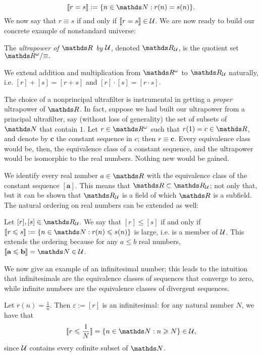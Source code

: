 \documentclass[draft.tex]{subfiles}
\begin{document}
\begin{equation*}
    \llbracket r = s \rrbracket := \{n \in \NN: r(n) = s(n)\}.
\end{equation*}
We now say that $r \equiv s$ if and only if $\llbracket r = s \rrbracket \in \mathcal{U}$. We are now ready to build our concrete example of nonstandard universe:
\begin{definition}
\label{def:ultrapower}
The \emph{ultrapower of $\RR$ by $\mathcal{U}$}, denoted $\RR_{\cl{U}}$, is the quotient set $\quot{\RR^{\omega}}{{\equiv}}.$ 
\end{definition}
We extend addition and multiplication from $\RR^{\omega}$ to $\RR_{\cl{U}}$ naturally, i.e. $[r]+[s] = [r+s]$ and $[r]\cdot[s] = [r \cdot s]$.
\begin{remark}
The choice of a nonprincipal ultrafilter is instrumental in getting a \emph{proper} ultrapower of $\RR$. In fact, suppose we had built our ultrapower from a principal ultrafilter, say (without loss of generality) the set of subsets of $\NN$ that contain $1$. Let $r \in \RR^{\omega}$ such that $r(1) = c \in \RR$, and denote by $\mathbf{c}$ the constant sequence in $c$; then $r \equiv \mathbf{c}$. Every equivalence class would be, then, the equivalence class of a constant sequence, and the ultrapower would be isomorphic to the real numbers. Nothing new would be gained.
\end{remark}
We identify every real number $a \in \RR$ with the equivalence class of the constant sequence $[\mathbf{a}]$. This means that $\RR \subset \RR_{\cl{U}}$; not only that, but it can be shown that $\RR_{\cl{U}}$ is a field of which $\RR$ is a subfield. The natural ordering on real numbers can be extended as well:
\begin{definition}
Let $[r], [s] \in \RR_{\cl{U}}$. We say that $[r] \leq [s]$ if and only if $\llbracket r \leq s \rrbracket := \{n \in \NN: r(n) \leq s(n)\}$ is large, i.e. is a member of $\mathcal{U}$. This extends the ordering because for any $a \leq b$ real numbers, $\llbracket \mathbf{a} \leq \mathbf{b} \rrbracket = \NN \in \cl{U}$.
\end{definition}
We now give an example of an infinitesimal number; this leads to the intuition that infinitesimals are the equivalence classes of sequences that converge to zero, while infinite numbers are the equivalence classes of divergent sequences.
\begin{example}
Let $r(n) = \frac{1}{n}$. Then $\varepsilon := [r]$ is an infinitesimal: for any natural number $N$, we have that
\begin{equation*}
    \llbracket r \leq \frac{1}{N} \rrbracket = \{n \in \NN: n \geq N\} \in \cl{U},
\end{equation*}
since $\mathcal{U}$ contains every cofinite subset of $\NN$.
\end{example}
\end{document}
